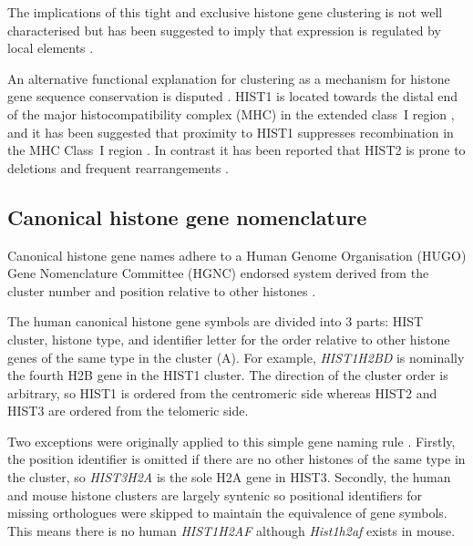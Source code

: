 	The implications of this tight and exclusive histone gene clustering 
	is not well characterised  
	but has been suggested to imply that expression is regulated by local elements \citep{close-regulators}.
	
	An alternative functional explanation for clustering as a mechanism for 
	histone gene sequence conservation is disputed .
	HIST1 is located towards the distal end of the major histocompatibility complex (MHC) 
	in the extended class~I region \citep{MHC-I-transcript, MHC-complete-sequencing-1999}, 
	and it has been suggested that proximity to HIST1 
	suppresses recombination in the MHC Class~I region \citep{MHC-repressed-by-HIST}. 
	In contrast it has been reported that HIST2 is prone to 
	deletions and frequent rearrangements \citep{HISTTwo-prone-deletion-discovery, HISTTwo-prone-deletion-focus}. 

  \subsection{Canonical histone gene nomenclature}
    Canonical histone gene names adhere to a Human Genome Organisation (HUGO) Gene Nomenclature Committee (HGNC) 
	endorsed system derived from the cluster number and position relative to other histones \citep{Marzluff02}.

	The human canonical histone gene symbols are divided into 3 parts: 
	HIST cluster, histone type, and identifier letter
	for the order relative to other histone genes of the same type in the cluster (A).
	For example, \textit{HIST1H2BD} is nominally the fourth H2B gene in the HIST1 cluster.
	The direction of the cluster order is arbitrary, 
	so HIST1 is ordered from the centromeric side 
	whereas HIST2 and HIST3 are ordered from the telomeric side.
	
	Two exceptions were originally applied to this simple gene naming rule \citep{Marzluff02}. 
	Firstly, the position identifier is omitted if there are no other histones of the same type in the cluster, 
	so \textit{HIST3H2A} is the sole H2A gene in HIST3. 
	Secondly, the human and mouse histone clusters are largely syntenic 
	so positional identifiers for missing orthologues were skipped to maintain the equivalence of gene symbols.
	This means there is no human \textit{HIST1H2AF} although \textit{Hist1h2af} exists in mouse.

